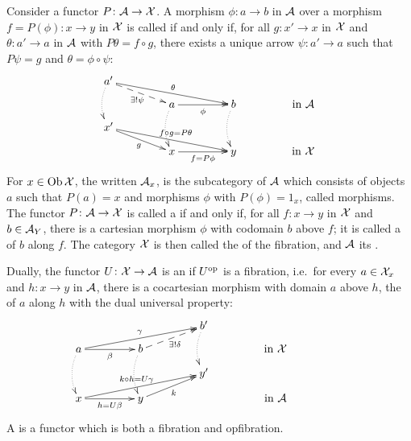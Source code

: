 \documentclass{amsart}
\begin{document}
Consider a functor $P \colon\mathcal{A} \to \mathcal{X}$. A morphism $\phi \colon a \to b$ in $\mathcal{A} $ over a morphism $f = P(\phi) \colon x \to y$ in $\mathcal{X}$ is called  if and only if, for all $g \colon x' \to x$ in $\mathcal{X}$ and $\theta \colon a'\to a$ in $\mathcal{A} $ with $P \theta = f \circ g$, there exists a unique arrow $\psi \colon a'\to a$ such that $P \psi = g$ and $\theta = \phi \circ \psi$:
\begin{equation}
    \xymatrix @R=.1in @C=.6in
    {a'\ar [drr]^-{\theta}\ar @{-->}[dr]_-{\exists!\psi} 
    \ar @{.>}@/_/[dd] &&& \\
    & a\ar[r]_-{\phi} \ar @{.>}@/_/[dd] & 
    b \ar @{.>}@/_/[dd] & \textrm{in }\A \\
    x'\ar [drr]^-{f\circ g=P\theta}\ar[dr]_-g &&&\\
    & x\ar[r]_-{f=P\phi} & y & \textrm{in }\X}\label{eq:13}
\end{equation}
For $x \in \operatorname{Ob}\mathcal{X}$, the  written $\mathcal{A}_x$, is the subcategory of $\mathcal{A}$ which consists of objects $a$ such that $P(a) = x$ and morphisms $\phi$ with $P(\phi) = 1_x$, called  morphisms. The functor $P \colon \mathcal{A} \to \mathcal{X}$ is called a  if and only if, for all $f \colon x \to y$ in $\mathcal{X}$ and $b\in\mathcal{A}_Y$, there is a cartesian morphism $\phi$ with codomain $b$ above $f$; it is called a  of $b$ along $f$. The category $\mathcal{X}$ is then called the  of the fibration, and $\mathcal{A} $ its .

Dually, the functor $U \colon \mathcal{X} \to \mathcal{A}$ is an  if $U^\mathrm{op}$ is a fibration, i.e.\ for every $a \in \mathcal{X} _x$ and $h \colon x \to y$ in $\mathcal{A}$, there is a cocartesian morphism with domain $a$ above $h$, the  of $a$ along $h$ with the dual universal property:
\begin{equation}\label{eq:opfibration}
\xymatrix @R=.1in @C=.6in
{&& b'\ar @{.>}@/_/[dd] &&\\
a\ar[r]_-{\beta} \ar @{.>}@/_/[dd]
\ar[urr]^-{\gamma} & 
b \ar @{.>}@/_/[dd] \ar @{-->}[ur]_-{\exists! \delta}
&& \textrm{in }\D\\
&& y' &&\\
x\ar[r]_-{h=\U\beta} \ar[urr]^-{k\circ h=\U\gamma}
 & y \ar[ur]_-k && \textrm{in }\C}
\end{equation}
A  is a functor which is both a fibration and opfibration.
\end{document}
